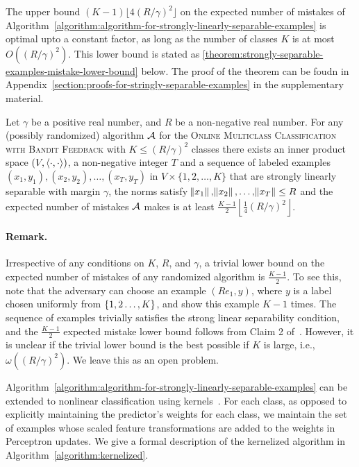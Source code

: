 The upper bound $(K-1) \lfloor 4(R/\gamma)^2 \rfloor$ on the expected number of
mistakes of
Algorithm~\ref{algorithm:algorithm-for-strongly-linearly-separable-examples} is
optimal upto a constant factor, as long as the number of classes $K$ is at most
$O((R/\gamma)^2)$. This lower bound is stated as
\autoref{theorem:strongly-separable-examples-mistake-lower-bound} below. The
proof of the theorem can be foudn in
Appendix~\ref{section:proofs-for-stringly-separable-examples} in the
supplementary material.

\begin{theorem}
\label{theorem:strongly-separable-examples-mistake-lower-bound}
Let $\gamma$ be a positive real number, and $R$ be a non-negative real
number. For any (possibly randomized) algorithm $\mathcal{A}$ for the \textsc{Online
Multiclass Classification with Bandit Feedback} with $K \le
(R/\gamma)^2$ classes there exists an inner product space $(V,
\left\langle \cdot, \cdot \right\rangle)$, a non-negative integer $T$ and a sequence of labeled
examples $(x_1, y_1), (x_2, y_2), \dots, (x_T, y_T)$ in $V \times
\{1,2,\dots,K\}$ that are strongly linearly separable with margin $\gamma$, the
norms satisfy $\norm{x_1}, \norm{x_2}, \dots, \norm{x_T} \le R$ and the expected
number of mistakes $\mathcal{A}$ makes is at least $\frac{K-1}{2} \left\lfloor
\frac{1}{4} (R/\gamma)^2 \right\rfloor$.
\end{theorem}

\paragraph{Remark.} Irrespective of any conditions on $K$, $R$, and $\gamma$, a
trivial lower bound on the expected number of mistakes of any randomized
algorithm is $\frac{K-1}{2}$. To see this, note that the adversary can choose an
example $(R e_1, y)$, where $y$ is a label chosen uniformly from
$\cbr{1,2\ldots,K}$, and show this example $K-1$ times. The sequence of examples
trivially satisfies the strong linear separability condition, and the
$\frac{K-1}{2}$ expected mistake lower bound follows from Claim 2
of~\citet{Daniely-Helbertal-2013}. However, it is unclear if the trivial lower
bound is the best possible if $K$ is large, i.e., $\omega((R/\gamma)^2)$. We
leave this as an open problem.

Algorithm~\ref{algorithm:algorithm-for-strongly-linearly-separable-examples} can
be extended to nonlinear classification using
kernels~\cite{Scholkopf-Smola-2002, Shawe-Taylor-Cristianini-2004}. For each
class, as opposed to explicitly maintaining the predictor's weights for each
class, we maintain the set of examples whose scaled feature transformations are
added to the weights in Perceptron updates. We give a formal description of the
kernelized algorithm in Algorithm~\ref{algorithm:kernelized}.

